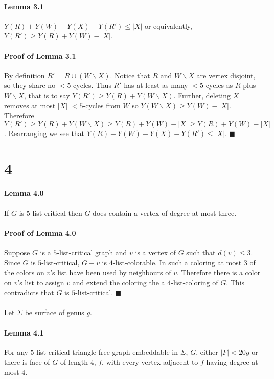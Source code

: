\documentclass[letterpaper,12pt,oneside,onecolumn]{report}
\begin{document}
\paragraph{Lemma 3.1}
 $Y(R) + Y(W) - Y(X) - Y(R') \leq |X|$ or equivalently, $Y(R') \geq Y(R) + Y(W) - |X|$.
\paragraph{Proof of Lemma 3.1}
By definition $R' = R \cup (W\backslash X)$. Notice that $R$ and $W\backslash X$ are vertex disjoint, so they share no $<5$-cycles. Thus $R'$ has at least as many $<5$-cycles as $R$ plus $W\backslash X$, that is to say $Y(R') \geq Y(R) + Y(W\backslash X)$. Further, deleting $X$ removes at most $|X|$ $<5$-cycles from $W$ so $Y(W\backslash X) \geq Y(W) - |X|$. Therefore $Y(R') \geq Y(R) + Y(W\backslash X) \geq Y(R) + Y(W) - |X| \geq Y(R) + Y(W) - |X|$. Rearranging we see that  $Y(R) + Y(W) - Y(X) - Y(R') \leq |X|$. $\blacksquare$
\paragraph{}
\section*{4}
\paragraph{Lemma 4.0}
If $G$ is $5$-list-critical then $G$ does contain a vertex of degree at most three.
\paragraph{Proof of Lemma 4.0}
Suppose $G$ is a $5$-list-critical graph and $v$ is a vertex of $G$ such that $d(v) \leq 3$. Since $G$ is $5$-list-critical, $G-v$ is $4$-list-colorable. In such a coloring at most $3$ of the colors on $v$'s list have been used by neighbours of $v$. Therefore there is a color on $v$'s list to assign $v$ and extend the coloring the a $4$-list-coloring of $G$. This contradicts that $G$ is $5$-list-critical. $\blacksquare$
\paragraph{}
Let $\Sigma$ be surface of genus $g$.
\paragraph{Lemma 4.1}
For any $5$-list-critical triangle free graph embeddable in $\Sigma$, $G$, either $|F| < 20g$ or there is face of $G$ of length $4$, $f$, with every vertex adjacent to $f$ having degree at most $4$. 
\end{document}
